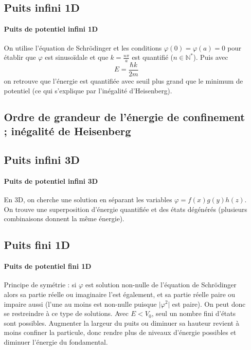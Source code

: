 \documentclass[french]{book}
\theoremstyle{plain}
\theoremstyle{definition}
\theoremstyle{remark}
\newcommand{\N}{\mathbb{N}}
\newcommand{\st}{^*}
\begin{document}
\subsection{Puits infini 1D}
\paragraph{Puits de potentiel infini 1D} On utilise l'équation de Schrödinger et les conditions $\varphi(0)=\varphi(a)=0$ pour établir que $\varphi$ est sinusoïdale et que $k=\frac{n\pi}{a}$ est quantifié ($n\in\N\st$). Puis avec $$E=\frac{\hbar k}{2m}$$ on retrouve que l’énergie est quantifiée avec seuil plus grand que le minimum de potentiel (ce qui s’explique par l’inégalité d’Heisenberg).
\subsection{Ordre de grandeur de l'énergie de confinement ; inégalité de Heisenberg}
\subsection{Puits infini 3D}

\paragraph{Puits de potentiel infini 3D} En 3D, on cherche une solution en séparant les variables $\varphi=f(x)g(y)h(z)$. On trouve une superposition d’énergie quantifiée et des états dégénérés (plusieurs combinaisons donnent la même énergie).
\subsection{Puits fini 1D}

\paragraph{Puits de potentiel fini 1D} Principe de symétrie : si $\varphi$ est solution non-nulle de l’équation de Schrödinger alors sa partie réelle ou imaginaire l’est également, et sa partie réelle paire ou impaire aussi (l’une au moins est non-nulle puisque $\lvert \varphi^2\rvert$ est paire). On peut donc se restreindre à ce type de solutions. Avec $E<V_0$, seul un nombre fini d’états sont possibles. Augmenter la largeur du puits ou diminuer sa hauteur revient à moins confiner la particule, donc rendre plus de niveaux d’énergie possibles et diminuer l’énergie du fondamental.
\end{document}
